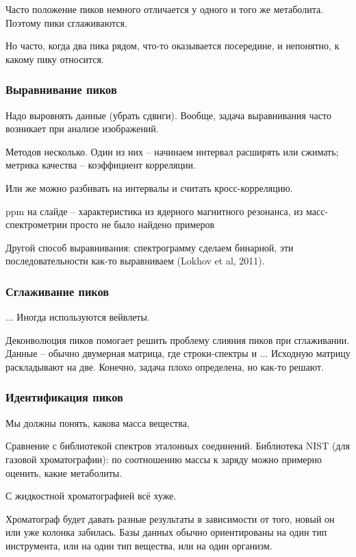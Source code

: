 \documentclass[main.tex]{subfiles}
\begin{document}
Часто положение пиков немного отличается у одного и того же метаболита.
Поэтому пики сглаживаются.

Но часто, когда два пика рядом, что-то оказывается посередине, и непонятно, к какому пику относится.

\subsubsection{Выравнивание пиков}

Надо выровнять данные (убрать сдвиги).
Вообще, задача выравнивания часто возникает при анализе изображений.

Методов несколько.
Один из них -- начинаем интервал расширять или сжимать; метрика качества -- коэффициент корреляции.

Или же можно разбивать на интервалы и считать кросс-корреляцию.

\begin{leftbar}
	ppm на слайде -- характеристика из ядерного магнитного резонанса, из масс-спектрометрии просто не было найдено примеров
\end{leftbar}

Другой способ выравнивания: спектрограмму сделаем бинарной, эти последовательности как-то выравниваем (Lokhov et al, 2011).

\subsubsection{Сглаживание пиков}

... Иногда используются вейвлеты.

Деконволюция пиков помогает решить проблему слияния пиков при сглаживании.
Данные -- обычно двумерная матрица, где строки-спектры и ... %
Исходную матрицу раскладывают на две.
Конечно, задача плохо определена, но как-то решают.

\subsubsection{Идентификация пиков}

Мы должны понять, какова масса вещества, 

Сравнение с библиотекой спектров эталонных соединений.
Библиотека NIST (для газовой хроматографии): по соотношению массы к заряду можно примерно оценить, какие метаболиты.

С жидкостной хроматографией всё хуже.

Хроматограф будет давать разные результаты в зависимости от того, новый он или уже колонка забилась.
Базы данных обычно ориентированы на один тип инструмента, или на один тип вещества, или на один организм.
\end{document}
